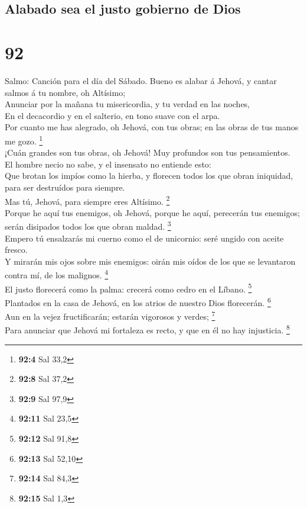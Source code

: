 \hypertarget{alabado-sea-el-justo-gobierno-de-dios}{%
\subsection{Alabado sea el justo gobierno de
Dios}\label{alabado-sea-el-justo-gobierno-de-dios}}

\hypertarget{section-91}{%
\section{92}\label{section-91}}

 Salmo: Canción para el día del Sábado. Bueno es alabar á
Jehová, y cantar salmos á tu nombre, oh Altísimo;\\
 Anunciar por la mañana tu misericordia, y tu verdad en las
noches,\\
 En el decacordio y en el salterio, en tono suave con el
arpa.\\
 Por cuanto me has alegrado, oh Jehová, con tus obras; en
las obras de tus manos me gozo. \footnote{\textbf{92:4} Sal 33,2}\\
 ¡Cuán grandes son tus obras, oh Jehová! Muy profundos son
tus pensamientos.\\
 El hombre necio no sabe, y el insensato no entiende esto:\\
 Que brotan los impíos como la hierba, y florecen todos los
que obran iniquidad, para ser destruídos para siempre.\\
 Mas tú, Jehová, para siempre eres Altísimo. \footnote{\textbf{92:8}
  Sal 37,2}\\
 Porque he aquí tus enemigos, oh Jehová, porque he aquí,
perecerán tus enemigos; serán disipados todos los que obran maldad.
\footnote{\textbf{92:9} Sal 97,9}\\
 Empero tú ensalzarás mi cuerno como el de unicornio: seré
ungido con aceite fresco.\\
 Y mirarán mis ojos sobre mis enemigos: oirán mis oídos de
los que se levantaron contra mí, de los malignos. \footnote{\textbf{92:11}
  Sal 23,5}\\
 El justo florecerá como la palma: crecerá como cedro en el
Líbano. \footnote{\textbf{92:12} Sal 91,8}\\
 Plantados en la casa de Jehová, en los atrios de nuestro
Dios florecerán. \footnote{\textbf{92:13} Sal 52,10}\\
 Aun en la vejez fructificarán; estarán vigorosos y verdes;
\footnote{\textbf{92:14} Sal 84,3}\\
 Para anunciar que Jehová mi fortaleza es recto, y que en
él no hay injusticia. \footnote{\textbf{92:15} Sal 1,3}

